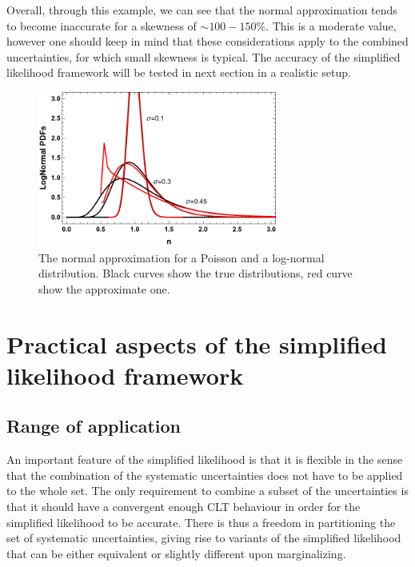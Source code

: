 \documentclass[11pt]{article}
\begin{document}
   Overall, through this example, we can see that the normal approximation tends to become inaccurate for a skewness of $\sim 100-150\%$. This is a moderate value, however one should keep in mind that these considerations apply to the combined uncertainties, for which small skewness is typical. The accuracy of the simplified likelihood framework will be tested in next section in a realistic setup.






\begin{figure}[t]
\begin{center}
\includegraphics[width=0.7\textwidth]{figures/PlotLogNormal.pdf}
\end{center}
\caption{\label{fig:approxs}
The normal approximation for a Poisson and a log-normal distribution. Black curves show the true distributions, red curve show the approximate one.
}
\end{figure}








\section{Practical aspects of the simplified likelihood framework}


\subsection{Range of application}

An important feature of the simplified likelihood is that it is flexible in the sense that the combination of the systematic uncertainties does not have to be applied to the whole set.  The only requirement to combine a subset of the  uncertainties is that it should have a convergent enough  CLT behaviour in order  for the simplified likelihood to be accurate. There is thus a freedom in partitioning the set of systematic uncertainties, giving rise to variants of the simplified likelihood that can be either equivalent or slightly different upon  marginalizing.
\end{document}
